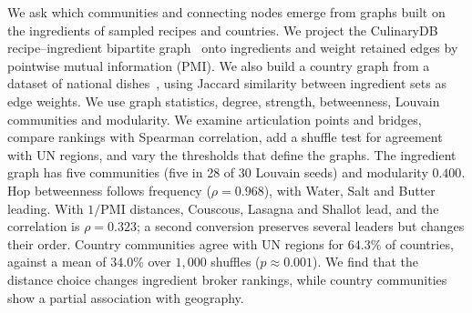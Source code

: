 We ask which communities and connecting nodes emerge from graphs built
on the ingredients of sampled recipes and countries. We project the CulinaryDB
recipe--ingredient bipartite graph~\cite{culinarydb} onto ingredients and
weight retained edges by pointwise mutual information (PMI). We also
build a country graph from a dataset of national dishes~\cite{wunderlich2022data},
using Jaccard similarity between ingredient sets as edge weights. We use
graph statistics, degree, strength, betweenness, Louvain communities and
modularity. We examine articulation points and bridges, compare rankings
with Spearman correlation, add a shuffle test for agreement with UN
regions, and vary the thresholds that define the graphs.
The ingredient graph has five communities (five in 28 of 30 Louvain
seeds) and modularity $0.400$. Hop betweenness follows frequency ($\rho=0.968$), with Water,
Salt and Butter leading. With $1/\mathrm{PMI}$ distances, Couscous,
Lasagna and Shallot lead, and the correlation is $\rho=0.323$; a second
conversion preserves several leaders but changes their order. Country
communities agree with UN regions for $64.3\%$ of countries, against a
mean of $34.0\%$ over $1{,}000$ shuffles ($p\approx0.001$). We find that
the distance choice changes ingredient broker rankings, while country
communities show a partial association with geography.
